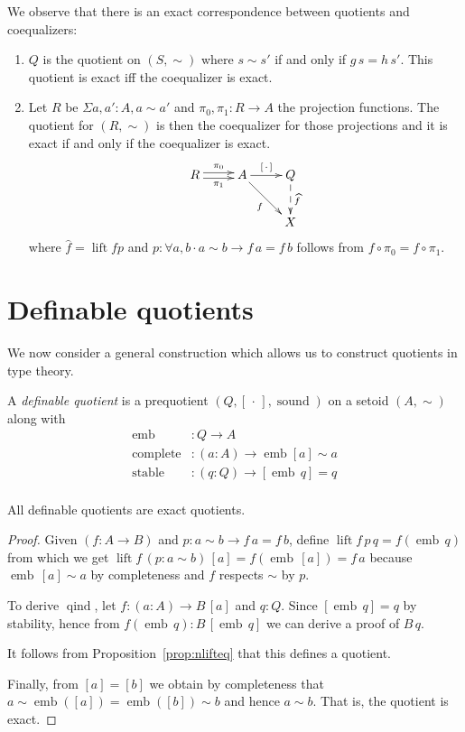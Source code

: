 \documentclass[envcountsame]{llncs}
\newcommand{\dotph}{\,\cdot\,} %
\providecommand{\class}[1]{[#1]}
\providecommand{\dlift}[1]{\widehat{#1}}
\DeclareMathOperator{\sound}{sound}
\DeclareMathOperator{\qind}{qind}
\DeclareMathOperator{\emb}{emb}
\DeclareMathOperator{\complete}{complete}
\DeclareMathOperator{\stable}{stable}
\DeclareMathOperator{\lift}{lift}
\renewcommand{\equiv}{=}
\begin{document}
We observe that there is an exact correspondence between quotients and coequalizers:
\begin{proposition}\hfill
\begin{enumerate}
\item $Q$ is the quotient on $(S,\sim)$ where $s\sim s'$ if and only if $g\,s=h\,s'$.
This quotient is exact if{f} the coequalizer is exact.
\item Let $R$ be $\Sigma a,a':A,a\sim a'$ and $\pi_0,\pi_1 : R\to A$ the projection functions. The quotient for $(R,\sim)$ is then the coequalizer for those projections and it is exact if and only if the coequalizer is exact.
\[\xymatrix{
R\ar@<0.5ex>[r]^{\pi_0}\ar@<-0.5ex>[r]_{\pi_1}& A\ar[r]^{\class\dotph}\ar[dr]_{f} & Q\ar@{-->}[d]^{\dlift f}\\
&&X
}\]
where $\dlift f=\lift f p$ and $p \colon \forall a,b\cdot a\sim b \to f\,a \equiv f\,b$ follows from $f \circ \pi_0 = f \circ \pi_1$.
\end{enumerate}
\end{proposition}

\section{Definable quotients}\label{sec:defquotients}

We now consider a general construction which allows us to construct quotients in type theory.

\begin{definition}\label{def:defquotients}
A \emph{definable quotient} is a prequotient $(Q, \class{\dotph}, \sound)$ on a setoid $(A,\sim)$ along with
\begin{align*}
\emb &: Q \to A\\
\complete &: (a : A) \to \emb {\class a} \sim a\\
\stable &: (q:Q) \to \class{\emb\,q} \equiv q\\
\end{align*}
\end{definition}

\begin{proposition}\label{prop:definableimpliesexact}
All definable quotients are exact quotients.
\end{proposition}
\begin{proof}

Given $(f\colon A \to B)$ and $p : a\sim b \to f\,a \equiv f\,b$, define $\lift f\, p \,q = f (\emb\,q)$ from which we get $\lift f \,(p : a \sim b)\,\class a\equiv f(\emb\,\class a)\equiv f\,a$ because $\emb\,\class a\sim a$ by completeness and $f$ respects $\sim$ by $p$.

To derive $\qind$, let $f:(a\colon A)\to B\,\class a$ and $q:Q$. Since $ \class{\emb\,q} \equiv q$ by stability, hence from $f (\emb\,q):B\,\class{\emb\,q}$ we can derive a proof of $B\,q$.

It follows from Proposition~\ref{prop:nlifteq} that this defines a quotient.

Finally, from $\class a \equiv \class b$
we obtain by completeness that $a\sim\emb(\class a)\equiv\emb(\class b)\sim b$ and hence $a\sim b$. That is, the quotient is exact.
\end{proof}
\end{document}
